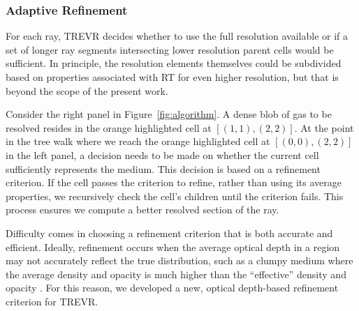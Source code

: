 \documentclass[fleq,usenatbib]{mnras}
\newcommand{\acro}{TREVR}
\begin{document}
{\subsubsection{Adaptive Refinement}\label{sec:adref}

For each ray, \acro{} decides whether to use the full resolution 
available or if a set of longer ray segments intersecting lower resolution parent 
cells would be sufficient. In principle, the resolution elements themselves 
could be subdivided based on properties associated with RT for even higher 
resolution, but that is beyond the scope of the present work.

Consider the right panel in Figure~\ref{fig:algorithm}. A dense blob of gas 
to be resolved resides in the orange highlighted cell at $[(1,1),(2,2)]$. At 
the point in the tree walk where we reach the orange highlighted cell at 
$[(0,0),(2,2)]$ in the left panel, a decision needs to be made on whether the 
current cell sufficiently represents the medium. This decision is based on a 
refinement criterion. If the cell passes the criterion to refine, rather than 
using its average properties, we recursively check the cell's children until 
the criterion fails. This process ensures we compute a better resolved section 
of the ray. 

Difficulty comes in choosing a refinement criterion that is both accurate and 
efficient. Ideally, refinement occurs when the average optical depth 
in a region may not accurately reflect the true distribution, such as a clumpy 
medium where the average density and opacity is much higher than the 
``effective'' density and opacity \citep{varosiDwek99, hegmanKegel03}. For 
this reason, we developed a new, optical depth-based refinement criterion 
for \acro{}.

}
\end{document}
